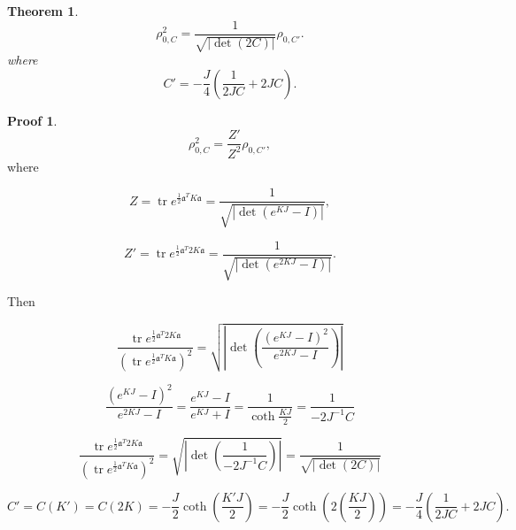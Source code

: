 \documentclass[12pt]{article}
\newtheorem{theorem}{Theorem}
\theoremstyle{definition}
\newtheorem*{demo}{Proof}
\begin{document}
	\begin{theorem}
		\begin{equation*}
			\rho_{0,C}^2 = \frac{1}{\sqrt{|\det(2 C)|}} \rho_{0,C'}.
		\end{equation*}
		where 
		\begin{equation*}
			C' = - \frac{J}{4}\left(\frac{1}{2 J C} + 2 J C\right).
		\end{equation*}
	\end{theorem}
	\begin{demo}
		\begin{equation*}
			\rho_{0,C}^2 = \frac{Z'}{Z^2}\rho_{0,C'},
		\end{equation*}
		where 
		
		\begin{equation*}
			Z = \operatorname{tr} e^{\frac12 \mathfrak{a}^T K  \mathfrak{a}}  = \frac{1}{\sqrt{|\det(e^{KJ} - I)|}},
		\end{equation*}
		
		\begin{equation*}
			Z' = \operatorname{tr} e^{\frac12 \mathfrak{a}^T 2K  \mathfrak{a}}  = \frac{1}{\sqrt{|\det(e^{2KJ} - I)|}}.
		\end{equation*}
		
		Then 
		
		\begin{equation*}
			\frac{\operatorname{tr} e^{\frac12 \mathfrak{a}^T 2K  \mathfrak{a}}  }{(\operatorname{tr} e^{\frac12 \mathfrak{a}^T K  \mathfrak{a}})^2} = \sqrt{\left|\det\left(\frac{(e^{KJ} - I)^2}{e^{2 KJ} - I}\right)\right|}
		\end{equation*}
		
		\begin{equation*}
			\frac{(e^{KJ} - I)^2}{e^{2 KJ} - I} = \frac{e^{KJ} - I}{e^{KJ} + I} = \frac{1}{\coth \frac{KJ}{2}} = \frac{1}{-2J^{-1} C}
		\end{equation*}
		
		\begin{equation*}
			\frac{\operatorname{tr} e^{\frac12 \mathfrak{a}^T 2K  \mathfrak{a}}  }{(\operatorname{tr} e^{\frac12 \mathfrak{a}^T K  \mathfrak{a}})^2} = \sqrt{\left|\det\left(\frac{1}{-2J^{-1} C}\right)\right|} = \frac{1}{\sqrt{|\det(2 C)|}}
		\end{equation*}
		
		\begin{equation*}
			C' = C(K') = C(2K) = -\frac{J}{2}\coth\left(\frac{K'J}{2}\right) = -\frac{J}{2}\coth\left(2\left(\frac{KJ}{2}\right)\right) = - \frac{J}{4}\left(\frac{1}{2 J C} + 2 J C\right).
		\end{equation*}
	\end{demo}
\end{document}
